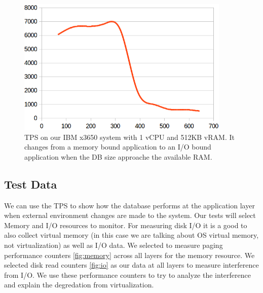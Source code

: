 \begin{figure}[!h]
  \begin{center}
  \includegraphics[width=4in]{images/SmallScale.png}
  \caption{TPS on our IBM x3650 system with 1 vCPU and 512KB vRAM. It changes from a memory bound application to an I/O bound application when the DB size approache the available RAM.}
  \label{smallIO}
  \end{center}
\end{figure}


\subsection{Test Data}
\indent We can use the TPS to show how the database performs at the application layer when external environment changes are made to the system.  Our tests will select Memory and I/O resources to monitor.  For measuring disk I/O it is a good to also collect virtual memory (in this case we are talking about OS virtual memory, not virtualization) as well as I/O data.  We selected to measure paging performance counters \ref{fig:memory} across all layers for the memory resource.  We selected disk read counters \ref{fig:io} as our data at all layers to measure interference from I/O. 
We use these performance counters to try to analyze the interference and explain the degredation from virtualization.

